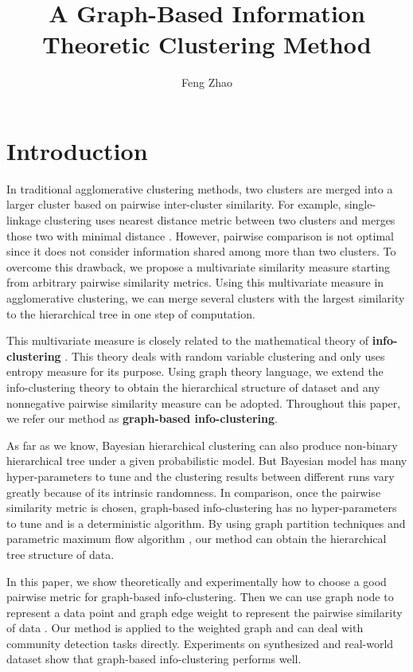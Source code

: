 \documentclass{article}
\title{A Graph-Based Information Theoretic Clustering Method}
\author{
  Feng Zhao
}
\begin{document}

\maketitle

\begin{abstract}

\end{abstract}

\section{Introduction}
In traditional agglomerative clustering methods, two clusters are merged into a larger cluster based on pairwise inter-cluster similarity.  For example, single-linkage clustering uses nearest distance metric between two clusters and merges those two with minimal distance \cite{RN16}.  However, pairwise comparison is not optimal since it does not consider information shared among more than two clusters.  To overcome this drawback, we propose a multivariate similarity measure starting from arbitrary pairwise similarity metrics. Using this multivariate measure in agglomerative clustering, we can merge several clusters with the largest similarity to the hierarchical tree in one step of computation.

This multivariate measure is closely related to the mathematical theory of \textbf{info-clustering} \cite{RN1}. This theory deals with random variable clustering and only uses entropy measure for its purpose. Using graph theory language, we extend the info-clustering theory to obtain the hierarchical structure of dataset and any nonnegative pairwise similarity measure can be adopted. Throughout this paper, we refer our method as \textbf{graph-based info-clustering}.

As far as we know, Bayesian hierarchical clustering \cite{Heller2005Bayesian} can also produce non-binary hierarchical tree under a given probabilistic model. But Bayesian model has many hyper-parameters to tune and the clustering results between different runs vary greatly because of its intrinsic randomness. In comparison, once the pairwise similarity metric is chosen, graph-based info-clustering has no hyper-parameters to tune and is a deterministic algorithm. By using graph partition techniques \cite{RN3} and parametric maximum flow algorithm \cite{RN4}, our method can obtain the hierarchical tree structure of data. 

In this paper, we show theoretically and experimentally how to choose a good pairwise metric for graph-based info-clustering. Then we can use graph node to represent a data point and graph edge weight to represent the pairwise similarity of data	. Our method is applied to the weighted graph and can deal with community detection tasks directly. Experiments on synthesized and real-world dataset show that graph-based info-clustering performs well. 
\end{document}
